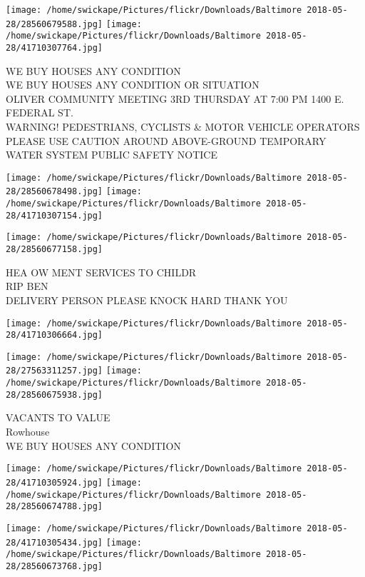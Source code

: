\documentclass[10pt,letterpaper]{article}
\begin{document}
\texttt{[image: /home/swickape/Pictures/flickr/Downloads/Baltimore 2018-05-28/28560679588.jpg]}
\texttt{[image: /home/swickape/Pictures/flickr/Downloads/Baltimore 2018-05-28/41710307764.jpg]}

WE BUY HOUSES ANY CONDITION\\
WE BUY HOUSES ANY CONDITION OR SITUATION\\
OLIVER COMMUNITY MEETING 3RD THURSDAY AT 7:00 PM 1400 E. FEDERAL ST.\\
WARNING!  PEDESTRIANS, CYCLISTS \& MOTOR VEHICLE OPERATORS PLEASE USE CAUTION AROUND ABOVE{-}GROUND TEMPORARY WATER SYSTEM PUBLIC SAFETY NOTICE\\
\pagebreak

\texttt{[image: /home/swickape/Pictures/flickr/Downloads/Baltimore 2018-05-28/28560678498.jpg]}
\texttt{[image: /home/swickape/Pictures/flickr/Downloads/Baltimore 2018-05-28/41710307154.jpg]}

\texttt{[image: /home/swickape/Pictures/flickr/Downloads/Baltimore 2018-05-28/28560677158.jpg]}

HEA OW MENT SERVICES TO CHILDR\\
RIP BEN\\
DELIVERY PERSON PLEASE KNOCK HARD THANK YOU\\
\pagebreak

\texttt{[image: /home/swickape/Pictures/flickr/Downloads/Baltimore 2018-05-28/41710306664.jpg]}

\vspace{0.25in}
\texttt{[image: /home/swickape/Pictures/flickr/Downloads/Baltimore 2018-05-28/27563311257.jpg]}
\texttt{[image: /home/swickape/Pictures/flickr/Downloads/Baltimore 2018-05-28/28560675938.jpg]}

VACANTS TO VALUE\\
Rowhouse\\
WE BUY HOUSES ANY CONDITION\\
\pagebreak

\texttt{[image: /home/swickape/Pictures/flickr/Downloads/Baltimore 2018-05-28/41710305924.jpg]}
\texttt{[image: /home/swickape/Pictures/flickr/Downloads/Baltimore 2018-05-28/28560674788.jpg]}

\texttt{[image: /home/swickape/Pictures/flickr/Downloads/Baltimore 2018-05-28/41710305434.jpg]}
\texttt{[image: /home/swickape/Pictures/flickr/Downloads/Baltimore 2018-05-28/28560673768.jpg]}
\end{document}
